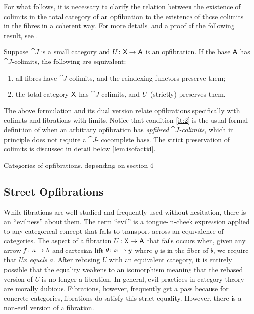 \documentclass{amsart}
\begin{document}
For what follows, it is necessary to clarify the relation between the existence of colimits in the total category of an opfibration to the existence of those colimits in the fibres in a coherent way. For more details, and a proof of the following result, see \cite[Cor. 3.7]{FibredAdjunctions}.

\begin{lem}\label{lem:fibrewiselimits}
Suppose $\cat{J}$ is a small category and $U\colon\mathsf{X}\to\mathsf{A}$ is an opfibration. If the base $\mathsf{A}$ has $\cat{J}$-colimits,
the following are equivalent:
\begin{enumerate}
 \item all fibres have $\cat{J}$-colimits, and the reindexing functors preserve them; \label{it:2}
 \item the total category $\mathsf{X}$ has $\cat{J}$-colimits, and $U$ (strictly) preserves them.
\end{enumerate}
\end{lem}
The above formulation and its dual version relate opfibrations specifically with colimits and fibrations with limits. Notice that condition \ref{it:2} is the usual formal definition of when an arbitrary opfibration has \emph{opfibred $\cat{J}$-colimits}, which in principle does not require a $\cat{J}$-
cocomplete base. The strict preservation of colimits is discussed in detail below \cref{lem:isofactid}.

{\chris Categories of opfibrations, depending on section 4}

\subsection*{Street Opfibrations}

While fibrations are well-studied and frequently used
without hesitation, there is an ``evilness'' about them. The
term ``evil'' is a tongue-in-cheek expression applied to any
categorical concept that fails to transport across an
equivalence of categories.  The aspect of a fibration
$ U \colon \mathsf{X} \to \mathsf{A} $ that fails occurs when, given any arrow
$ f \colon a \to b $ and cartesian lift
$ \theta \colon x \to y $ where $ y $ is in the fiber of
$ b $, we require that $ Ux $ \emph{equals} $ a $.  After
rebasing $ U $ with an equivalent category, it is entirely
possible that the equality weakens to an isomorphism meaning
that the rebased version of $ U $ is no longer a
fibration. In general, evil practices in category theory are
morally dubious. Fibrations, however, frequently get a pass
because for concrete categories, fibrations do satisfy this
strict equality.  However, there is a non-evil version of a
fibration.
\end{document}
